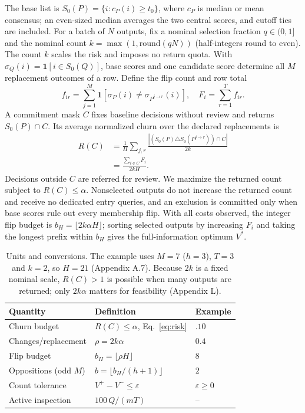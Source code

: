 \documentclass[11pt]{article}
\newcommand{\bH}{b_H}
\newcommand{\Sz}{S_0}
\newcommand{\ind}{\mathbf{1}}
\begin{document}
The base list is $\Sz(P)=\{i: c_P(i)\ge t_0\}$, where $c_P$ is median or mean consensus; an even-sized median averages the two central scores, and cutoff ties are included. For a batch of $N$ outputs, fix a nominal selection fraction $q\in(0,1]$ and the nominal count $k=\max(1,\mathrm{round}(qN))$ (half-integers round to even). The count $k$ scales the risk and imposes no return quota. With $\sigma_Q(i)=\ind[i\in\Sz(Q)]$, base scores and one candidate score determine all $M$ replacement outcomes of a row. Define the flip count and row total
\begin{equation}
f_{ir}=\sum_{j=1}^{M}\ind[\sigma_P(i)\neq\sigma_{P^{j\to r}}(i)],\quad F_i=\sum_{r=1}^{T}f_{ir}.
\label{eq:flips}
\end{equation}
A commitment mask $C$ fixes baseline decisions without review and returns $\Sz(P)\cap C$. Its average normalized churn over the declared replacements is
\begin{equation}
\begin{split}
R(C)&=\frac1H\sum_{j,r}\frac{|(\Sz(P)\triangle \Sz(P^{j\to r}))\cap C|}{2k}\\
&=\frac{\sum_{i\in C}F_i}{2kH}.
\end{split}
\label{eq:risk}
\end{equation}
Decisions outside $C$ are referred for review. We maximize the returned count subject to $R(C)\le\alpha$. Nonselected outputs do not increase the returned count and receive no dedicated entry queries, and an exclusion is committed only when base scores rule out every membership flip. With all costs observed, the integer flip budget is $\bH=\lfloor 2k\alpha H\rfloor$; sorting selected outputs by increasing $F_i$ and taking the longest prefix within $\bH$ gives the full-information optimum $V^*$.

\begin{table}[t]
\centering\footnotesize
\setlength{\tabcolsep}{2pt}
\begin{tabular}{@{}lll@{}}
\toprule
Quantity & Definition & Example\\
\midrule
Churn budget & $R(C)\le\alpha$, Eq.~\eqref{eq:risk} & $.10$\\
Changes/replacement & $\rho=2k\alpha$ & $0.4$\\
Flip budget & $\bH=\lfloor\rho H\rfloor$ & $8$\\
Oppositions (odd $M$) & $b=\lfloor \bH/(h+1)\rfloor$ & $2$\\
Count tolerance & $V^+-V^-\le\varepsilon$ & $\varepsilon\ge0$\\
Active inspection & $100\,Q/(mT)$ & --\\
\bottomrule
\end{tabular}
\caption{Units and conversions. The example uses $M=7$ ($h=3$), $T=3$ and $k=2$, so $H=21$ (Appendix A.7). Because $2k$ is a fixed nominal scale, $R(C)>1$ is possible when many outputs are returned; only $2k\alpha$ matters for feasibility (Appendix L).}
\label{tab:units}
\end{table}
\end{document}
